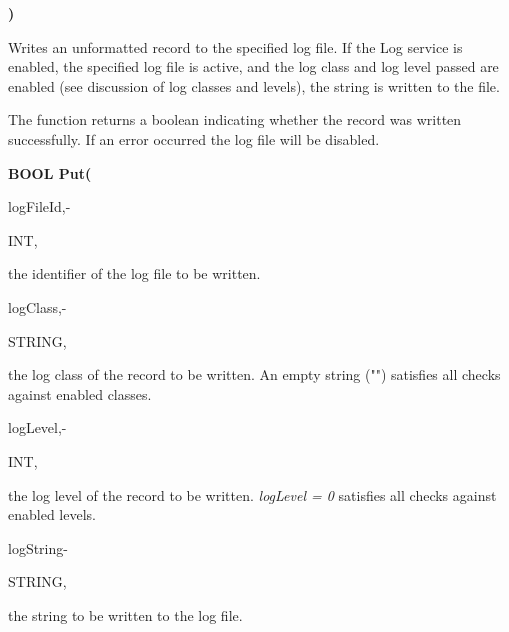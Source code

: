 \textbf{)}

\medskip
Writes an unformatted record to the specified log file.  If the Log service is enabled, the specified log file is active, and the log class and log level passed are enabled (see discussion of log classes and levels), the string is written to the file.

The function returns a boolean indicating whether the record was written successfully. If an error occurred the log file will be disabled.

\newpage
\textbf{BOOL Put(}

\hfill
\begin{minipage}{\dimexpr\textwidth-2em}

        \medskip
        \begin{minipage}[t][][b]{9.5em}logFileId,\hfill{-}\end{minipage}
        \begin{minipage}[t][][b]{5.5em}INT,\hfill\end{minipage}
        \begin{minipage}[t][][b]{\dimexpr\textwidth-15.5em}
            the identifier of the log file to be written.
        \end{minipage}\vfill

        \medskip
        \begin{minipage}[t][][b]{9.5em}logClass,\hfill{-}\end{minipage}
        \begin{minipage}[t][][b]{5.5em}STRING,\hfill\end{minipage}
        \begin{minipage}[t][][b]{\dimexpr\textwidth-15.5em}
            the log class of the record to be written. An empty string ("") satisfies all checks against enabled classes.
        \end{minipage}\vfill

        \medskip
        \begin{minipage}[t][][b]{9.5em}logLevel,\hfill{-}\end{minipage}
        \begin{minipage}[t][][b]{5.5em}INT,\hfill\end{minipage}
        \begin{minipage}[t][][b]{\dimexpr\textwidth-15.5em}
            the log level of the record to be written. \textit{logLevel = 0} satisfies all checks against enabled levels.
        \end{minipage}\vfill

        \medskip
        \begin{minipage}[t][][b]{9.5em}logString\hfill{-}\end{minipage}
        \begin{minipage}[t][][b]{5.5em}STRING,\hfill\end{minipage}
        \begin{minipage}[t][][b]{\dimexpr\textwidth-15.5em}
            the string to be written to the log file.
        \end{minipage}\vfill
\end{minipage}

